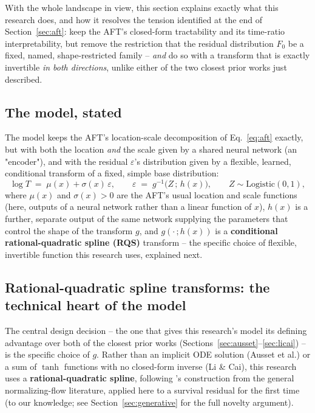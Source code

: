 \documentclass[11pt]{article}
\newcommand{\eps}{\varepsilon}
\begin{document}
With the whole landscape in view, this section explains exactly what
this research does, and how it resolves the tension identified at the
end of Section~\ref{sec:aft}: keep the AFT's closed-form tractability
and its time-ratio interpretability, but remove the restriction that the
residual distribution $F_0$ be a fixed, named, shape-restricted family --
\emph{and} do so with a transform that is exactly invertible \emph{in
both directions}, unlike either of the two closest prior works just
described.

\subsection{The model, stated}
The model keeps the AFT's location-scale decomposition of
Eq.~\eqref{eq:aft} exactly, but with both the location \emph{and} the
scale given by a shared neural network (an "encoder"), and with the
residual $\eps$'s distribution given by a flexible, learned, conditional
transform of a fixed, simple base distribution:
\begin{equation}
  \log T \;=\; \mu(x) + \sigma(x)\,\eps, \qquad
  \eps \;=\; g^{-1}\bigl(Z\,;\, h(x)\bigr), \qquad
  Z \sim \mathrm{Logistic}(0, 1),
  \label{eq:flowsurv}
\end{equation}
where $\mu(x)$ and $\sigma(x) > 0$ are the AFT's usual location and scale
functions (here, outputs of a neural network rather than a linear
function of $x$), $h(x)$ is a further, separate output of the same
network supplying the parameters that control the shape of the
transform $g$, and $g(\cdot\,; h(x))$ is a \textbf{conditional
rational-quadratic spline (RQS)} transform -- the specific choice of
flexible, invertible function this research uses, explained next.

\subsection{Rational-quadratic spline transforms: the technical heart of the model}
\label{sec:rqs}

The central design decision -- the one that gives this research's model
its defining advantage over both of the closest prior works
(Sections~\ref{sec:ausset}--\ref{sec:licai}) -- is the specific choice of
$g$. Rather than an implicit ODE solution (Ausset et al.) or a sum of
$\tanh$ functions with no closed-form inverse (Li \& Cai), this research
uses a \textbf{rational-quadratic spline}, following
\citet{durkan2019nsf}'s construction from the general normalizing-flow
literature, applied here to a survival residual for the first time (to
our knowledge; see Section~\ref{sec:generative} for the full novelty
argument).
\end{document}
